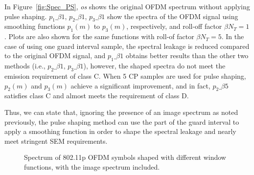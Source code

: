 %
In Figure~\ref{fig:Spec_PS}, \emph{os} shows the original OFDM spectrum without applying pulse shaping.
$p_1\_\beta1$, $p_2\_\beta1$, $p_3\_\beta1$ show the spectra of the OFDM signal using smoothing functions $p_1(m)$ to $p_3(m)$, respectively, and roll-off factor $\beta N_{T}=1$. Plots are also shown for the same functions with roll-of factor $\beta N_{T}=5$.
In the case of using one guard interval sample, the spectral leakage is reduced compared to the original OFDM signal, and  $p_1\_\beta1$ obtains better results than the other two methods (i.e., $p_2\_\beta1$, $p_3\_\beta1$), however, the shaped spectra do not meet the emission requirement of class C.
When 5 CP samples are used for pulse shaping, $p_2(m)$ and $p_3(m)$ achieve a significant improvement, and in fact, $p_2\_\beta5$ satisfies class C and almost meets the requirement of class D.

Thus, we can state that, ignoring the presence of an image spectrum as noted previously, the pulse shaping method can use the part of the guard interval to apply a smoothing function in order to shape the spectral leakage and nearly meet  stringent SEM requirements.

\begin{figure}
	\centering
\caption{Spectrum of 802.11p OFDM symbols shaped with different window functions, with the image spectrum included.}
\label{fig:Inter_Spec_PS}
\vspace{-4mm}
\end{figure}

